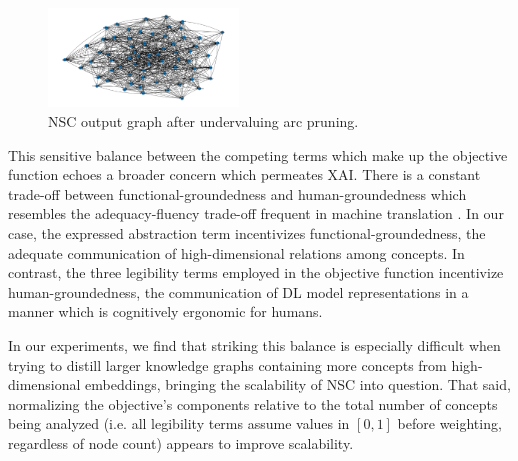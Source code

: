 \begin{figure}[h]
    \centering
    \includegraphics[width=0.45\textwidth]{img/short_run.png}
    \caption{NSC output graph after undervaluing arc pruning.}\label{fig:pruning}
\end{figure}

This sensitive balance between the competing terms which make up the objective function echoes a broader concern which permeates XAI. There is a constant trade-off between functional-groundedness and human-groundedness which resembles the adequacy-fluency trade-off frequent in machine translation \citep{madsen_post-hoc_2021}. In our case, the expressed abstraction term incentivizes functional-groundedness, the adequate communication of high-dimensional relations among concepts. In contrast, the three legibility terms employed in the objective function incentivize human-groundedness, the communication of DL model representations in a manner which is cognitively ergonomic for humans.

In our experiments, we find that striking this balance is especially difficult when trying to distill larger knowledge graphs containing more concepts from high-dimensional embeddings, bringing the scalability of NSC into question. That said, normalizing the objective's components relative to the total number of concepts being analyzed (i.e. all legibility terms assume values in $[0, 1]$ before weighting, regardless of node count) appears to improve scalability.

